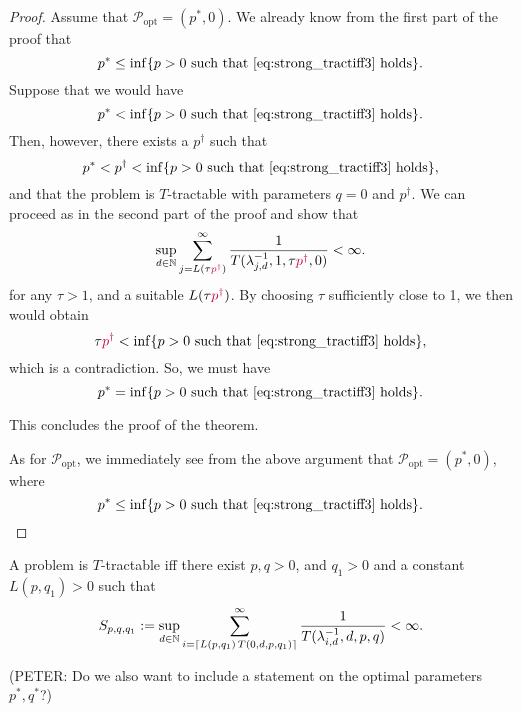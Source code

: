 \documentclass[11pt,a4paper]{article}
\newcommand{\peter}[1]{\begingroup\color{purple}#1\endgroup}
\begin{document}
\begin{proof}
Assume that $\mathcal{P}_{\text{opt}}=(p^*,0)$. We already know from the first part of the proof that
\[
 p^* \le \inf\{p>0\ \mbox{such that \eqref{eq:strong_tractiff3} holds}\}.
\]
Suppose that we would have
\[
 p^* < \inf\{p>0\ \mbox{such that \eqref{eq:strong_tractiff3} holds}\}.
\]
\peter{Then, however, there exists a $p^\dag$ such that
\[
p^* < p^\dag < \inf\{p>0\ \mbox{such that \eqref{eq:strong_tractiff3} holds}\},
\]
and that the problem is $T$-tractable with parameters $q=0$ and $p^\dag$. }
We can proceed as in the second part of the proof and show that
\[
 \sup_{d\in\naturals} \sum_{j=L(\tau \peter{p^\dag})}^\infty \frac{1}{T(\lambda_{j,d}^{-1},1, \tau \peter{p^\dag},0)}<\infty.
\]
for any $\tau>1$, and a suitable $L(\tau \peter{p^\dag})$. By choosing $\tau$ sufficiently close to 1, we then would
obtain
\[
 \tau \peter{p^\dag} < \inf\{p>0\ \mbox{such that \eqref{eq:strong_tractiff3} holds}\},
\]
which is a contradiction. So, we must have
\[
 p^* = \inf\{p>0\ \mbox{such that \eqref{eq:strong_tractiff3} holds}\}.
\]

This concludes the proof of the theorem.



As for $\mathcal{P}_{\text{opt}}$, we immediately see from the above argument that $\mathcal{P}_{\text{opt}}=(p^*,0)$, where
\[
p^* \le \inf\{p>0\ \mbox{such that \eqref{eq:strong_tractiff3} holds}\}.
\]

\end{proof}








\bigskip

\begin{theorem}\label{thm_main_tract2}
A problem is $T$-tractable iff there exist $p,q>0$, and $q_1>0$ and a constant $L(p,q_1) > 0$ such that
\begin{equation} \label{eq:tractiff4}
     S_{p,q,q_1}:=\sup_{d \in \mathbb{N}}
     \sum_{i = \lceil L(p,q_1)\, T(0,d,p,q_1) \rceil}^\infty \frac{1}{T(\lambda^{-1}_{i,d},d,p,q)}< \infty.
\end{equation}
\end{theorem}

\peter{(PETER: Do we also want to include a statement on the optimal parameters $p^*,q^*$?)}
\end{document}
